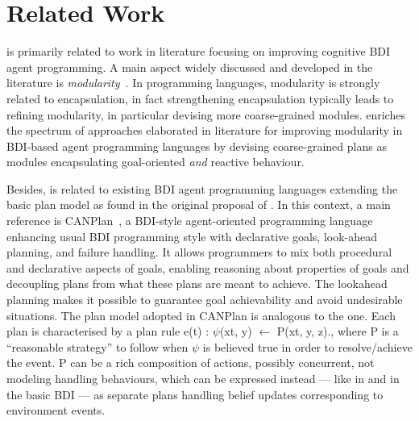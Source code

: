 \section{Related Work}
\label{sec:related}

{\aser} is primarily related to work in literature focusing on improving cognitive BDI agent programming.
%
%
A main aspect widely discussed and developed in the literature is  \emph{modularity}~\cite{Madden2010, Busetta2000,5285116,Novak:2006:MBA:1160633.1160814,Ortiz-Hernandez2016,vanRiemsdijk:2006:GMA:1160633.1160864,Hindriks2008,Nunes2014}.
%
In programming languages, modularity is strongly related to encapsulation, in fact  strengthening encapsulation typically leads to refining modularity, in particular devising more coarse-grained modules.
%
{\aser} enriches the spectrum of approaches elaborated in literature for improving modularity in BDI-based agent programming languages by devising coarse-grained plans as modules encapsulating goal-oriented \emph{and} reactive behaviour. 

Besides, {\aser} is related to existing BDI agent programming languages extending the basic plan model as found in the original proposal of {\asl}.
%
In this context, a main reference is \textsf{CANPlan}~\cite{Sardina2011}, a  BDI-style agent-oriented programming language enhancing usual BDI programming style with declarative goals, look-ahead planning, and failure handling. 
%
It allows programmers to mix both procedural and declarative aspects of goals, enabling reasoning about properties of goals and decoupling plans from what these plans are meant to achieve. 
%
The lookahead planning makes it possible to guarantee goal achievability and avoid undesirable situations. 
%
The plan model adopted in {\textsf{CANPlan}} is analogous to the {\asl} one. Each plan is characterised by a plan rule \textsf{e(t) : $\psi$(xt, y) $\leftarrow$ P(xt, y, z).}, where \textsf{P} is a ``reasonable strategy'' to follow when \textsf{$\psi$} is believed true in order to resolve/achieve the event.
%
\textsf{P} can be a rich composition of actions, possibly concurrent, not modeling handling behaviours, which can be expressed instead --- like in {\asl} and in the basic BDI --- as separate plans handling belief updates corresponding  to environment events. 
